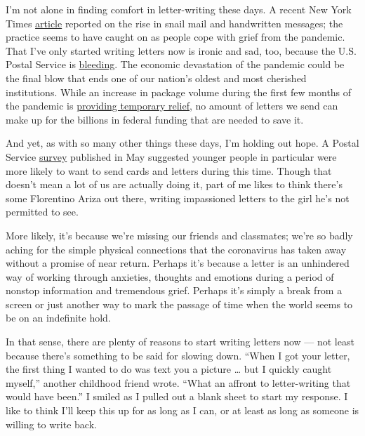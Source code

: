 I'm not alone in finding comfort in letter-writing these days. A recent
New York Times
\href{https://www.nytimes3xbfgragh.onion/2020/06/24/style/mail-letters-coronavirus.html}{article}
reported on the rise in snail mail and handwritten messages; the
practice seems to have caught on as people cope with grief from the
pandemic. That I've only started writing letters now is ironic and sad,
too, because the U.S. Postal Service is
\href{https://slate.com/news-and-politics/2020/05/coronavirus-postal-service-office-congress-money-trouble.html}{bleeding}.
The economic devastation of the pandemic could be the final blow that
ends one of our nation's oldest and most cherished institutions. While
an increase in package volume during the first few months of the
pandemic is
\href{https://www.washingtonpost.com/business/2020/06/25/postal-service-packages-coronavirus/}{providing
temporary relief}, no amount of letters we send can make up for the
billions in federal funding that are needed to save it.

And yet, as with so many other things these days, I'm holding out hope.
A Postal Service
\href{https://postalpro.usps.com/market-research/covid-mail-attitudes}{survey}
published in May suggested younger people in particular were more likely
to want to send cards and letters during this time. Though that doesn't
mean a lot of us are actually doing it, part of me likes to think
there's some Florentino Ariza out there, writing impassioned letters to
the girl he's not permitted to see.

More likely, it's because we're missing our friends and classmates;
we're so badly aching for the simple physical connections that the
coronavirus has taken away without a promise of near return. Perhaps
it's because a letter is an unhindered way of working through anxieties,
thoughts and emotions during a period of nonstop information and
tremendous grief. Perhaps it's simply a break from a screen or just
another way to mark the passage of time when the world seems to be on an
indefinite hold.

In that sense, there are plenty of reasons to start writing letters now
--- not least because there's something to be said for slowing down.
``When I got your letter, the first thing I wanted to do was text you a
picture \ldots{} but I quickly caught myself,'' another childhood friend
wrote. ``What an affront to letter-writing that would have been.'' I
smiled as I pulled out a blank sheet to start my response. I like to
think I'll keep this up for as long as I can, or at least as long as
someone is willing to write back.

